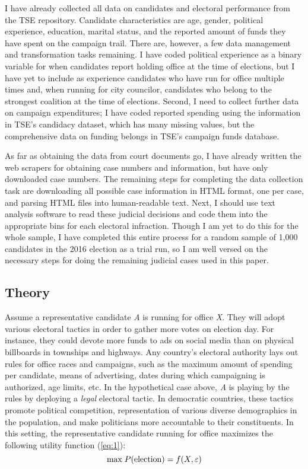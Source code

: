 \documentclass[11pt]{article}
\newcommand{\refp}[1]{(\ref{#1})}
\begin{document}
I have already collected all data on candidates and electoral performance from the TSE repository. Candidate characteristics are age, gender, political experience, education, marital status, and the reported amount of funds they have spent on the campaign trail. There are, however, a few data management and transformation tasks remaining. I have coded political experience as a binary variable for when candidates report holding office at the time of elections, but I have yet to include as experience candidates who have run for office multiple times and, when running for city councilor, candidates who belong to the strongest coalition at the time of elections. Second, I need to collect further data on campaign expenditures; I have coded reported spending using the information in TSE's candidacy dataset, which has many missing values, but the comprehensive data on funding belongs in TSE's campaign funds database.

As far as obtaining the data from court documents go, I have already written the web scrapers for obtaining case numbers and information, but have only downloaded case numbers. The remaining steps for completing the data collection task are downloading all possible case information in HTML format, one per case, and parsing HTML files into human-readable text. Next, I should use text analysis software to read these judicial decisions and code them into the appropriate bins for each electoral infraction. Though I am yet to do this for the whole sample, I have completed this entire process for a random sample of 1,000 candidates in the 2016 election as a trial run, so I am well versed on the necessary steps for doing the remaining judicial cases used in this paper.

\subsection{Theory} \label{subsec:theory_paper1}

Assume a representative candidate \emph{A} is running for office \emph{X}. They will adopt various electoral tactics in order to gather more votes on election day. For instance, they could devote more funds to ads on social media than on physical billboards in townships and highways. Any country's electoral authority lays out rules for office races and campaigns, such as the maximum amount of spending per candidate, means of advertising, dates during which campaigning is authorized, age limits, etc. In the hypothetical case above, \emph{A} is playing by the rules by deploying a \emph{legal} electoral tactic. In democratic countries, these tactics promote political competition, representation of various diverse demographics in the population, and make politicians more accountable to their constituents. In this setting, the representative candidate running for office maximizes the following utility function \refp{eq:1}: \\
\begin{equation} \label{eq:1}
  \text{max} \thickspace P(\text{election}) = f(X, \varepsilon)
\end{equation}
\end{document}
